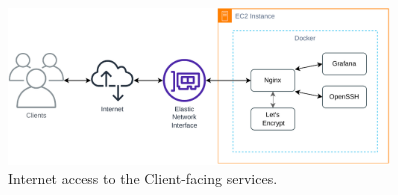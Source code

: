 \begin{figure}[!htbp]
    \centering
    \includegraphics[width=0.90\textwidth]{img/diagrams/pdf/old-arch-nginx.drawio.pdf}
    \caption[Internet access to the Client-facing services]{Internet access to the Client-facing services.}
    \label{fig:old-arch-nginx}
\end{figure}
